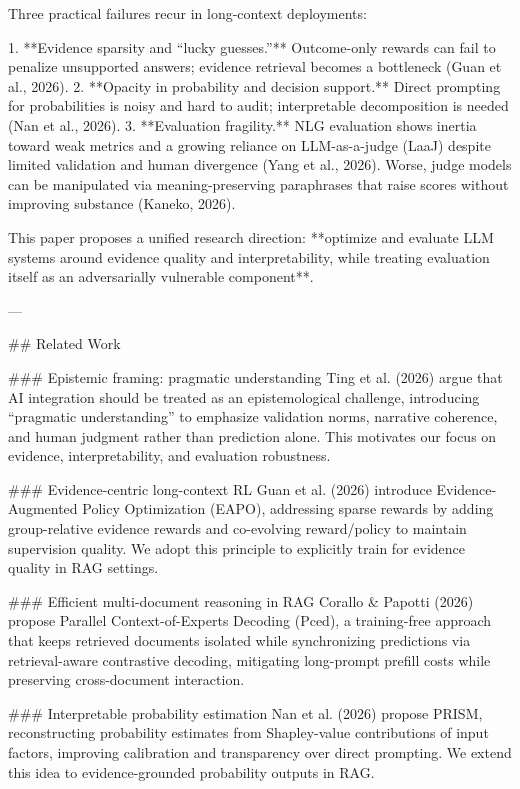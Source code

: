 Three practical failures recur in long-context deployments:

1. **Evidence sparsity and “lucky guesses.”** Outcome-only rewards can fail to penalize unsupported answers; evidence retrieval becomes a bottleneck (Guan et al., 2026).  
2. **Opacity in probability and decision support.** Direct prompting for probabilities is noisy and hard to audit; interpretable decomposition is needed (Nan et al., 2026).  
3. **Evaluation fragility.** NLG evaluation shows inertia toward weak metrics and a growing reliance on LLM-as-a-judge (LaaJ) despite limited validation and human divergence (Yang et al., 2026). Worse, judge models can be manipulated via meaning-preserving paraphrases that raise scores without improving substance (Kaneko, 2026).

This paper proposes a unified research direction: **optimize and evaluate LLM systems around evidence quality and interpretability, while treating evaluation itself as an adversarially vulnerable component**.

---

## Related Work  

### Epistemic framing: pragmatic understanding  
Ting et al. (2026) argue that AI integration should be treated as an epistemological challenge, introducing “pragmatic understanding” to emphasize validation norms, narrative coherence, and human judgment rather than prediction alone. This motivates our focus on evidence, interpretability, and evaluation robustness.

### Evidence-centric long-context RL  
Guan et al. (2026) introduce Evidence-Augmented Policy Optimization (EAPO), addressing sparse rewards by adding group-relative evidence rewards and co-evolving reward/policy to maintain supervision quality. We adopt this principle to explicitly train for evidence quality in RAG settings.

### Efficient multi-document reasoning in RAG  
Corallo & Papotti (2026) propose Parallel Context-of-Experts Decoding (Pced), a training-free approach that keeps retrieved documents isolated while synchronizing predictions via retrieval-aware contrastive decoding, mitigating long-prompt prefill costs while preserving cross-document interaction.

### Interpretable probability estimation  
Nan et al. (2026) propose PRISM, reconstructing probability estimates from Shapley-value contributions of input factors, improving calibration and transparency over direct prompting. We extend this idea to evidence-grounded probability outputs in RAG.

